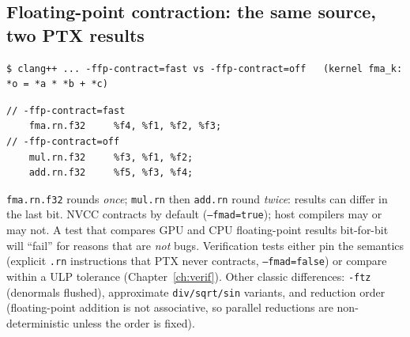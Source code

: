 \documentclass[10pt,a4paper,openany,oneside]{report}
\begin{document}
\subsection{Floating-point contraction: the same source, two PTX results}
\begin{lstlisting}[style=shcmd]
$ clang++ ... -ffp-contract=fast vs -ffp-contract=off   (kernel fma_k: *o = *a * *b + *c)
\end{lstlisting}
\begin{lstlisting}[language={PTX},style=out]
// -ffp-contract=fast
    fma.rn.f32     %f4, %f1, %f2, %f3;
// -ffp-contract=off
    mul.rn.f32     %f3, %f1, %f2;
    add.rn.f32     %f5, %f3, %f4;
\end{lstlisting}
\begin{trapbox}
\texttt{fma.rn.f32} rounds \emph{once}; \texttt{mul.rn} then \texttt{add.rn} round \emph{twice}: results can differ in the last bit. NVCC contracts by default (\texttt{--fmad=true}); host compilers may or may not. A test that compares GPU and CPU floating-point results bit-for-bit will ``fail'' for reasons that are \emph{not} bugs. Verification tests either pin the semantics (explicit \texttt{.rn} instructions that PTX never contracts, \texttt{--fmad=false}) or compare within a ULP tolerance (Chapter~\ref{ch:verif}). Other classic differences: \texttt{-ftz} (denormals flushed), approximate \texttt{div/sqrt/sin} variants, and reduction order (floating-point addition is not associative, so parallel reductions are non-deterministic unless the order is fixed).
\end{trapbox}
\end{document}
